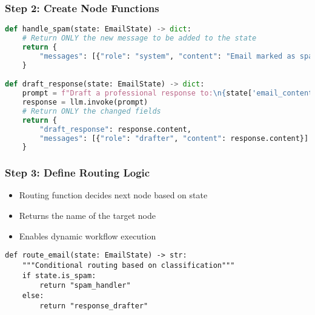 \begin{frame}[fragile]\frametitle{Step 2: Create Node Functions}
      \begin{lstlisting}[language=Python, basicstyle=\tiny]
def handle_spam(state: EmailState) -> dict:
    # Return ONLY the new message to be added to the state
    return {
        "messages": [{"role": "system", "content": "Email marked as spam and moved to junk."}]
    }

def draft_response(state: EmailState) -> dict:
    prompt = f"Draft a professional response to:\n{state['email_content']}"
    response = llm.invoke(prompt)
    # Return ONLY the changed fields
    return {
        "draft_response": response.content,
        "messages": [{"role": "drafter", "content": response.content}]
    }
      \end{lstlisting}
\end{frame}

\begin{frame}[fragile]\frametitle{Step 3: Define Routing Logic}

      \begin{itemize}
        \item Routing function decides next node based on state
        \item Returns the name of the target node
        \item Enables dynamic workflow execution
      \end{itemize}
	  
      \begin{lstlisting}
def route_email(state: EmailState) -> str:
    """Conditional routing based on classification"""
    if state.is_spam:
        return "spam_handler"
    else:
        return "response_drafter"
      \end{lstlisting}
     
\end{frame}

